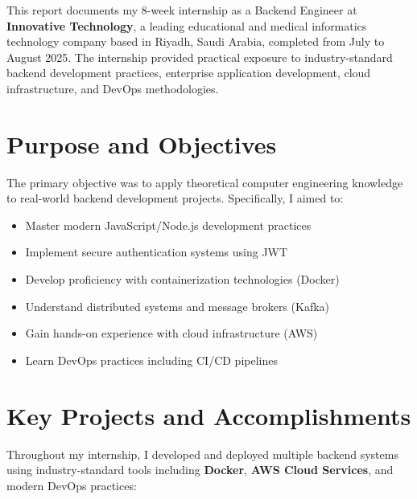 
This report documents my 8-week internship as a Backend Engineer at \textbf{Innovative Technology}, 
a leading educational and medical informatics technology company based in Riyadh, Saudi Arabia, 
completed from July to August 2025. The internship provided practical exposure to industry-standard 
backend development practices, enterprise application development, cloud infrastructure, and DevOps methodologies.

\section*{Purpose and Objectives}

The primary objective was to apply theoretical computer engineering knowledge to real-world backend development projects. Specifically, I aimed to:
\begin{itemize}
    \item Master modern JavaScript/Node.js development practices
    \item Implement secure authentication systems using JWT
    \item Develop proficiency with containerization technologies (Docker)
    \item Understand distributed systems and message brokers (Kafka)
    \item Gain hands-on experience with cloud infrastructure (AWS)
    \item Learn DevOps practices including CI/CD pipelines
\end{itemize}

\section*{Key Projects and Accomplishments}

Throughout my internship, I developed and deployed multiple backend systems using industry-standard tools including \textbf{Docker}, \textbf{AWS Cloud Services}, and modern DevOps practices:

